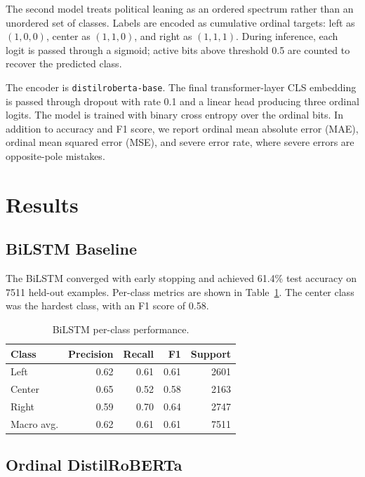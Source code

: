 \documentclass[10pt,twocolumn]{article}
\begin{document}
The second model treats political leaning as an ordered spectrum rather than an
unordered set of classes. Labels are encoded as cumulative ordinal targets:
left as $(1,0,0)$, center as $(1,1,0)$, and right as $(1,1,1)$. During
inference, each logit is passed through a sigmoid; active bits above threshold
0.5 are counted to recover the predicted class.

The encoder is \texttt{distilroberta-base}. The final transformer-layer CLS
embedding is passed through dropout with rate 0.1 and a linear head producing
three ordinal logits. The model is trained with binary cross entropy over the
ordinal bits. In addition to accuracy and F1 score, we report ordinal mean
absolute error (MAE), ordinal mean squared error (MSE), and severe error rate,
where severe errors are opposite-pole mistakes.

\section{Results}

\subsection{BiLSTM Baseline}

The BiLSTM converged with early stopping and achieved 61.4\% test accuracy on
7511 held-out examples. Per-class metrics are shown in
Table~\ref{tab:lstm-results}. The center class was the hardest class, with an
F1 score of 0.58.

\begin{table}[h]
\centering
\caption{BiLSTM per-class performance.}
\label{tab:lstm-results}
\begin{tabular}{lrrrr}
\toprule
Class & Precision & Recall & F1 & Support \\
\midrule
Left & 0.62 & 0.61 & 0.61 & 2601 \\
Center & 0.65 & 0.52 & 0.58 & 2163 \\
Right & 0.59 & 0.70 & 0.64 & 2747 \\
\midrule
Macro avg. & 0.62 & 0.61 & 0.61 & 7511 \\
\bottomrule
\end{tabular}
\end{table}

\subsection{Ordinal DistilRoBERTa}
\end{document}
